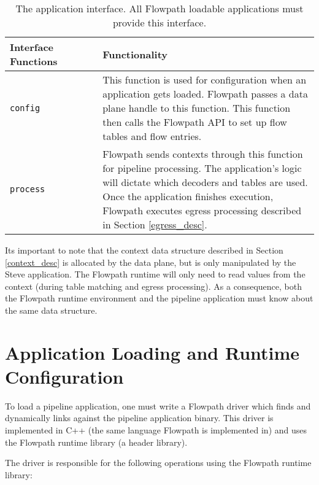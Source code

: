 \begin{table}
\caption{The application interface. All Flowpath loadable applications must provide this interface.}
\begin{center}
\begin{tabular}{| p{0.3\linewidth} | p{0.7\linewidth} |}
\hline
Interface Functions & Functionality \\

\hline

\texttt{config} & This function is used for configuration when an application gets loaded. Flowpath passes a data plane handle to this function. This function then calls the Flowpath API to set up flow tables and flow entries. \\

\hline

\texttt{process} & Flowpath sends contexts through this function for pipeline processing. The application's logic will dictate which decoders and tables are used. Once the application finishes execution, Flowpath executes egress processing described in Section \ref{egress_desc}. \\

\hline

\end{tabular}
\end{center}
\label{tbl:steve_api}
\end{table}

Its important to note that the context data structure described in Section \ref{context_desc} is allocated by the data plane, but is only manipulated by the Steve application. The Flowpath runtime will only need to read values from the context (during table matching and egress processing). As a consequence, both the Flowpath runtime environment and the pipeline application must know about the same data structure.

\section{Application Loading and Runtime Configuration} \label{config_guide}

To load a pipeline application, one must write a Flowpath driver which finds and dynamically links against the pipeline application binary. This driver is implemented in C++ (the same language Flowpath is implemented in) and uses the Flowpath runtime library (a header library).

The driver is responsible for the following operations using the Flowpath runtime library:

